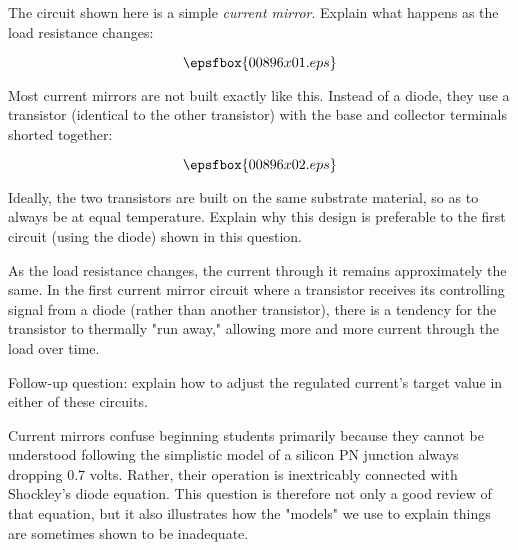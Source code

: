 

The circuit shown here is a simple {\it current mirror}.  Explain what happens as the load resistance changes:

$$\epsfbox{00896x01.eps}$$

Most current mirrors are not built exactly like this.  Instead of a diode, they use a transistor (identical to the other transistor) with the base and collector terminals shorted together:

$$\epsfbox{00896x02.eps}$$

Ideally, the two transistors are built on the same substrate material, so as to always be at equal temperature.  Explain why this design is preferable to the first circuit (using the diode) shown in this question.







As the load resistance changes, the current through it remains approximately the same.  In the first current mirror circuit where a transistor receives its controlling signal from a diode (rather than another transistor), there is a tendency for the transistor to thermally "run away," allowing more and more current through the load over time.

\vskip 10pt

Follow-up question: explain how to adjust the regulated current's target value in either of these circuits.







Current mirrors confuse beginning students primarily because they cannot be understood following the simplistic model of a silicon PN junction always dropping 0.7 volts.  Rather, their operation is inextricably connected with Shockley's diode equation.  This question is therefore not only a good review of that equation, but it also illustrates how the "models" we use to explain things are sometimes shown to be inadequate.




